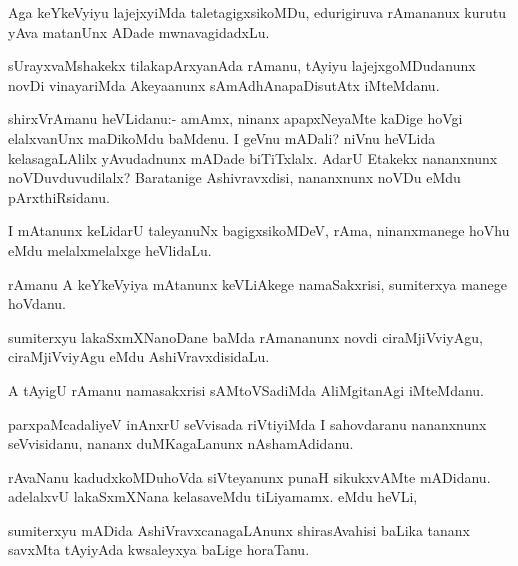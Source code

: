 \documentclass{article}
\begin{document}
\begin{mn}%
Aga keYkeVyiyu lajejxyiMda taletagigxsikoMDu, edurigiruva rAmananux kurutu yAva matanUnx 
ADade mwnavagidadxLu. 
\end{mn}

\begin{mn}%
sUrayxvaMshakekx tilakapArxyanAda rAmanu, tAyiyu lajejxgoMDudanunx novDi vinayariMda 
Akeyaanunx sAmAdhAnapaDisutAtx iMteMdanu.
\end{mn}

\begin{mn}%
shirxVrAmanu heVLidanu:- amAmx, ninanx apapxNeyaMte kaDige hoVgi elalxvanUnx maDikoMdu 
baMdenu. I geVnu mADali? niVnu heVLida kelasagaLAlilx yAvudadnunx mADade biTiTxlalx. AdarU 
Etakekx nananxnunx  noVDuvduvudilalx? Baratanige Ashivravxdisi, nananxnunx noVDu eMdu 
pArxthiRsidanu.
\end{mn}

\begin{mn}%
I mAtanunx keLidarU taleyanuNx bagigxsikoMDeV, rAma, ninanxmanege hoVhu eMdu melalxmelalxge 
heVlidaLu.
\end{mn}

\begin{mn}%
rAmanu A keYkeVyiya mAtanunx keVLiAkege namaSakxrisi, sumiterxya manege hoVdanu.
\end{mn}

\begin{mn}%
sumiterxyu lakaSxmXNanoDane baMda rAmananunx novdi ciraMjiVviyAgu, ciraMjiVviyAgu eMdu 
AshiVravxdisidaLu.
\end{mn}

\begin{mn}%
A tAyigU rAmanu namasakxrisi sAMtoVSadiMda AliMgitanAgi iMteMdanu.
\end{mn}

\begin{mn}%
parxpaMcadaliyeV inAnxrU seVvisada riVtiyiMda I sahovdaranu nananxnunx seVvisidanu, nananx 
duMKagaLanunx nAshamAdidanu. 
\end{mn}

\begin{mn}%
rAvaNanu kadudxkoMDuhoVda siVteyanunx punaH sikukxvAMte mADidanu. adelalxvU lakaSxmXNana 
kelasaveMdu tiLiyamamx. eMdu heVLi,
\end{mn}

\begin{mn}%
sumiterxyu mADida AshiVravxcanagaLAnunx shirasAvahisi baLika tananx savxMta tAyiyAda 
kwsaleyxya baLige horaTanu.
\end{mn}
\end{document}
